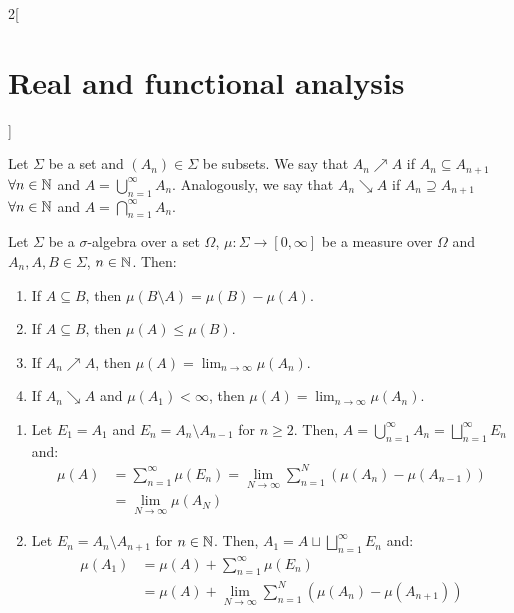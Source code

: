 \documentclass[../../../main_math.tex]{subfiles}
\begin{document}
\begin{multicols}{2}[\section{Real and functional analysis}]
\begin{definition}[Measure]
\begin{enumerate}[ref = $\sigma$-additivity]
    \end{enumerate}
  \end{definition}
  \begin{definition}
    Let $\Sigma$ be a set and $(A_n)\in\Sigma$ be subsets. We say that $A_n\nearrow A$ if $A_n\subseteq A_{n+1}$ $\forall n\in\mathbb{N}$ and $A=\bigcup_{n=1}^\infty A_n$. Analogously, we say that $A_n\searrow A$ if $A_n\supseteq A_{n+1}$ $\forall n\in\mathbb{N}$ and $A=\bigcap_{n=1}^\infty A_n$.
  \end{definition}
  \begin{proposition}
    Let $\Sigma$ be a $\sigma$-algebra over a set $\Omega$, $\mu:\Sigma\longrightarrow[0,\infty]$ be a measure over $\Omega$ and $A_n,A,B\in\Sigma$, $n\in\mathbb{N}$. Then:
    \begin{enumerate}
      \item If $A\subseteq B$, then $\mu(B\setminus A)=\mu(B)-\mu(A)$.
      \item If $A\subseteq B$, then $\mu(A)\leq\mu(B)$.
            \item\label{RFA_incresingseq} If $A_n\nearrow A$, then $\displaystyle\mu(A)=\lim_{n\to\infty} \mu(A_n)$.
            \item\label{RFA_decresingseq} If $A_n\searrow A$ and $\mu(A_1)<\infty$, then $\displaystyle\mu(A)=\lim_{n\to\infty} \mu(A_n)$.
    \end{enumerate}
  \end{proposition}
  \begin{sproof}
    \begin{enumerate}
      \doubleitem $$\mu(B)=\mu(A\sqcup (B\setminus A))=\mu(A) +\mu(B\setminus A)$$
      \item Let $E_1=A_1$ and $E_n=A_n\setminus A_{n-1}$ for $n\geq 2$. Then, $A=\bigcup_{n=1}^\infty A_n=\bigsqcup_{n=1}^\infty E_n$ and:
            \begin{align*}
              \mu(A) & =\sum_{n=1}^\infty \mu(E_n)=\lim_{N\to\infty}\sum_{n=1}^N(\mu(A_n)-\mu(A_{n-1})) \\
                     & =\lim_{N\to\infty}\mu(A_N)
            \end{align*}
      \item Let $E_n=A_{n}\setminus A_{n+1}$ for $n\in\mathbb{N}$. Then, $A_1=A\sqcup\bigsqcup_{n=1}^\infty E_n$ and:
            \begin{align*}
              \mu(A_1) & =\mu(A)+\sum_{n=1}^\infty \mu(E_n)                           \\
                       & =\mu(A)+\lim_{N\to\infty}\sum_{n=1}^N(\mu(A_n)-\mu(A_{n+1})) \\

\end{align*}
\end{enumerate}
\end{sproof}
\end{multicols}
\end{document}
